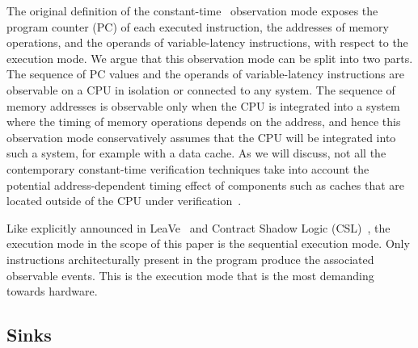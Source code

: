 The original definition of the constant-time~\cite{guarnieri2021hardware} observation mode exposes the program counter (PC) of each executed instruction, the addresses of memory operations, and the operands of variable-latency instructions, with respect to the execution mode.
We argue that this observation mode can be split into two parts.
The sequence of PC values and the operands of variable-latency instructions are observable on a CPU in isolation or connected to any system.
The sequence of memory addresses is observable only when the CPU is integrated into a system where the timing of memory operations depends on the address, and hence this observation mode conservatively assumes that the CPU will be integrated into such a system, for example with a data cache.
As we will discuss, not all the contemporary constant-time verification techniques take into account the potential address-dependent timing effect of components such as caches that are located outside of the CPU under verification~\cite{ceesay2024mucfi,dinesh2024conjunct,dinesh2025h}.

Like explicitly announced in LeaVe~\cite{wang2023specification} and Contract Shadow Logic (CSL)~\cite{tan2025contractshadowlogic}, the execution mode in the scope of this paper is the sequential execution mode.
Only instructions architecturally present in the program produce the associated observable events.
This is the execution mode that is the most demanding towards hardware.

\subsection{Sinks}
\label{subsec:sinks}

